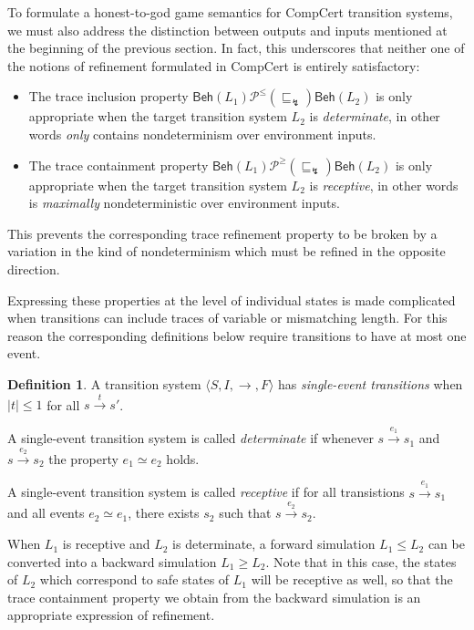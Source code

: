 \documentclass[11pt,oneside,draft]{book}
\theoremstyle{definition}
\newtheorem{definition}[theorem]{Definition}
\newcommand{\kw}[1]{\ensuremath{ \mathsf{#1} }}
\newcommand{\refby}{\sqsubseteq} %
\begin{document}
To formulate a honest-to-god game semantics for
CompCert transition systems,
we must also address the distinction between
outputs and inputs mentioned
at the beginning of the previous section.
In fact,
this underscores that
neither one of the notions of refinement
formulated in CompCert
is entirely satisfactory:
\begin{itemize}
  \item
    The trace inclusion property
    $\kw{Beh}(L_1)
     \mathrel{\mathcal{P}^\le(\refby_\lightning)}
     \kw{Beh}(L_2)$
    is only appropriate when
    the target transition system $L_2$
    is \emph{determinate},
    in other words \emph{only} contains nondeterminism
    over environment inputs.
  \item
    The trace containment property
    $\kw{Beh}(L_1)
     \mathrel{\mathcal{P}^\ge(\refby_\lightning)}
     \kw{Beh}(L_2)$
    is only appropriate when
    the target transition system $L_2$
    is \emph{receptive},
    in other words is \emph{maximally} nondeterministic
    over environment inputs.
\end{itemize}
This prevents the corresponding trace refinement property
to be broken by a variation in the kind of nondeterminism which
must be refined in the opposite direction.

Expressing these properties at the level of individual states
is made complicated when transitions can include
traces of variable or mismatching length.
For this reason the corresponding definitions below
require transitions to have at most one event.

\begin{definition}
A transition system
$\langle S, I, {\rightarrow}, F \rangle$
has \emph{single-event transitions}
when $|t| \le 1$ for all $s \stackrel{t}{\rightarrow} s'$.

A single-event transition system is called
\emph{determinate}
if whenever
$s \stackrel{e_1}{\rightarrow} s_1$ and
$s \stackrel{e_2}{\rightarrow} s_2$
the property $e_1 \simeq e_2$ holds.

A single-event transition system is called
\emph{receptive}
if for all transistions $s \stackrel{e_1}{\rightarrow} s_1$
and all events $e_2 \simeq e_1$,
there exists $s_2$ such that
$s \stackrel{e_2}{\rightarrow} s_2$.
\end{definition}

When $L_1$ is receptive and $L_2$ is determinate,
a forward simulation $L_1 \le L_2$ can be converted
into a backward simulation $L_1 \ge L_2$.
Note that in this case,
the states of $L_2$ which correspond
to safe states of $L_1$ will be receptive as well,
so that the trace containment property we obtain
from the backward simulation
is an appropriate expression of refinement.
\end{document}
